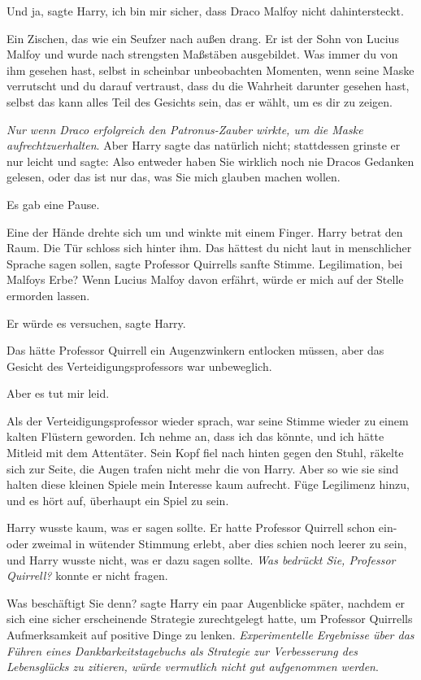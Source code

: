 \glqq Und ja\grqq{}, sagte Harry, \glqq ich bin mir sicher, dass Draco Malfoy
nicht dahintersteckt.\grqq{}

Ein Zischen, das wie ein Seufzer nach außen drang. \glqq Er ist der Sohn von
Lucius Malfoy und wurde nach strengsten Maßstäben ausgebildet. Was immer du von
ihm gesehen hast, selbst in scheinbar unbeobachten Momenten, wenn seine Maske
verrutscht und du darauf vertraust, dass du die Wahrheit darunter gesehen hast,
selbst das kann alles Teil des Gesichts sein, das er wählt, um es dir zu
zeigen.\grqq{}

\emph{Nur wenn Draco erfolgreich den Patronus-Zauber wirkte, um die Maske
aufrechtzuerhalten}. Aber Harry sagte das natürlich nicht; stattdessen grinste
er nur leicht und sagte: \glqq Also entweder haben Sie wirklich noch nie Dracos
Gedanken gelesen, oder das ist nur das, was Sie mich glauben machen
wollen.\grqq{}

Es gab eine Pause.

Eine der Hände drehte sich um und winkte mit einem Finger. Harry betrat den
Raum. Die Tür schloss sich hinter ihm. \glqq Das hättest du nicht laut in
menschlicher Sprache sagen sollen\grqq{}, sagte Professor Quirrells sanfte
Stimme. \glqq Legilimation, bei Malfoys Erbe? Wenn Lucius Malfoy davon erfährt,
würde er mich auf der Stelle ermorden lassen.\grqq{}

\glqq Er würde es versuchen\grqq{}, sagte Harry.

Das hätte Professor Quirrell ein Augenzwinkern entlocken müssen, aber das
Gesicht des Verteidigungsprofessors war unbeweglich.

\glqq Aber es tut mir leid.\grqq{}

Als der Verteidigungsprofessor wieder sprach, war seine Stimme wieder zu einem
kalten Flüstern geworden. \glqq Ich nehme an, dass ich das könnte, und ich hätte
Mitleid mit dem Attentäter.\grqq{} Sein Kopf fiel nach hinten gegen den Stuhl,
räkelte sich zur Seite, die Augen trafen nicht mehr die von Harry. \glqq Aber so
wie sie sind halten diese kleinen Spiele mein Interesse kaum aufrecht. Füge
Legilimenz hinzu, und es hört auf, überhaupt ein Spiel zu sein.\grqq{}

Harry wusste kaum, was er sagen sollte. Er hatte Professor Quirrell schon ein-
oder zweimal in wütender Stimmung erlebt, aber dies schien noch leerer zu sein,
und Harry wusste nicht, was er dazu sagen sollte. \emph{Was bedrückt Sie,
Professor Quirrell?} konnte er nicht fragen.

\glqq Was beschäftigt Sie denn?\grqq{} sagte Harry ein paar Augenblicke später,
nachdem er sich eine sicher erscheinende Strategie zurechtgelegt hatte, um
Professor Quirrells Aufmerksamkeit auf positive Dinge zu lenken.
\emph{Experimentelle Ergebnisse über das Führen eines Dankbarkeitstagebuchs als
Strategie zur Verbesserung des Lebensglücks zu zitieren, würde vermutlich nicht
gut aufgenommen werden}.

